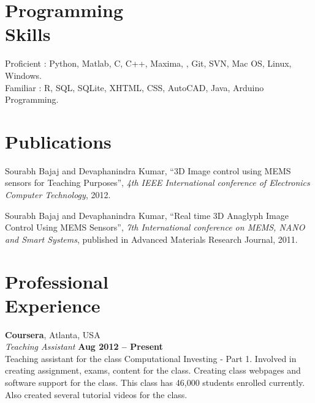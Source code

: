 \documentclass[margin,line]{resume}
\begin{document}
\begin{resume}
    \section{\mysidestyle Programming\\Skills} 
    Proficient : Python, Matlab, C, C++, Maxima, \LaTeXe, Git, SVN, Mac OS, Linux, Windows. \\
    Familiar : R, SQL, SQLite, XHTML, CSS, AutoCAD, Java, Arduino Programming. \\
    
    \section{\mysidestyle Publications}

    Sourabh Bajaj and Devaphanindra Kumar,
    ``3D Image control using MEMS sensors for Teaching Purposes'',
    \textsl{4th IEEE International conference of Electronics Computer Technology}, 2012.

    \vspace{-2mm}
    Sourabh Bajaj and Devaphanindra Kumar,
    ``Real time 3D Anaglyph Image Control Using MEMS Sensors'',
    \textsl{7th International conference on MEMS, NANO and Smart Systems}, published in Advanced Materials Research Journal, 2011.


    \section{\mysidestyle Professional\\Experience}

    \textbf{Coursera}, Atlanta, USA \vspace{2mm}\\\vspace{1mm}%
    \textsl{Teaching Assistant} \hfill \textbf{Aug 2012 -- Present}\\
    Teaching assistant for the class Computational Investing - Part 1. Involved in creating assignment, exams, content for the class. Creating class webpages and software support for the class. This class has 46,000 students enrolled currently. Also created several tutorial videos for the class.


\end{resume}
\end{document}
